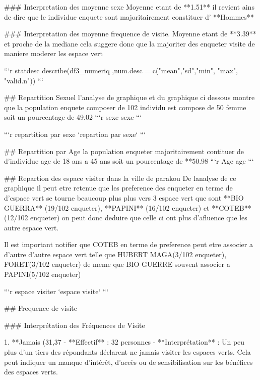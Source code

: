 ### Interpretation des moyenne sexe
Moyenne etant de **1.51** il revient ains de dire que le individue enquete sont majoritairement constituer d' **Hommes** 

### Interpretation des moyenne frequence de visite.
Moyenne etant de **3.39** et proche de la mediane cela suggere donc que la majoriter des enqueter visite de maniere moderer les espace vert  

```{r statdesc}
describe(df3_numeriq ,num.desc = c("mean","sd","min", "max", "valid.n"))
```

## Repartition Sexuel
l'analyse de graphique et du graphique ci dessous montre que la population enquete composer de 102 individu est compose de 50 femme soit un pourcentage de 49.02 %
```{r sexe}
sexe
```

```{r repartition par sexe}
`repartion par sexe`
```

## Repartition par Age
la population enqueter majoritairement contituer de d'individue age de 18 ans a 45 ans soit un pourcentage de **50.98 %
```{r Age}
age
```

## Repartion des espace visiter dans la ville de parakou
De lanalyse de ce graphique il peut etre retenue que les preference des enqueter en terme de d'espace vert se tourne beaucoup plus plus vers 3 espace vert que sont **BIO GUERRA** (19/102 enqueter), **PAPINI** (16/102 enqueter) et **COTEB** (12/102 enqueter) on peut donc deduire que celle ci ont plus d'afluence que les autre espace vert. 

Il est important notifier que COTEB en terme de preference peut etre associer a d'autre d'autre espace vert telle que HUBERT MAGA(3/102 enqueter), FORET(3/102 enqueter) de meme que BIO GUERRE souvent associer a PAPINI(5/102 enqueter) 

```{r espace visiter}
`espace visite`
```

## Frequence de visite

### Interprétation des Fréquences de Visite

1. **Jamais (31,37%
   - **Effectif** : 32 personnes
   - **Interprétation** : Un peu plus d'un tiers des répondants déclarent ne jamais visiter les espaces verts. Cela peut indiquer un manque d'intérêt, d'accès ou de sensibilisation sur les bénéfices des espaces verts.

